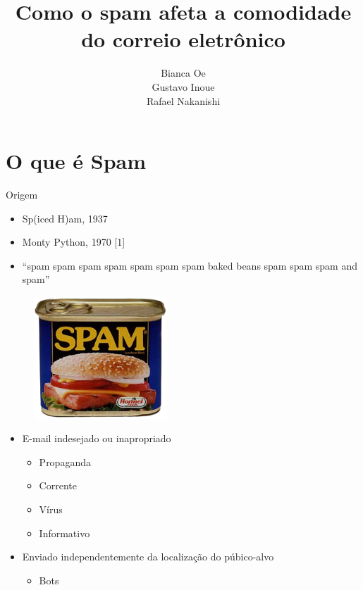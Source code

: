 \documentclass[dvipdfm]{beamer}
\title{Como o spam afeta a comodidade do correio eletrônico}
\author{Bianca Oe\\
		Gustavo Inoue\\
		Rafael Nakanishi}
\institute{Instituto de Ciências Matemáticas e Computação}
\begin{document}
\begin{frame}
	\titlepage
\end{frame}

\begin{frame}
\end{frame}

\section{O que é Spam}
\begin{frame}{Origem}
	\begin{itemize}
		\item Sp(iced H)am, 1937
		\item Monty Python, 1970 [1]
		\item “spam spam spam spam spam spam spam baked beans  spam spam spam and  spam”
	\end{itemize}

	\begin{figure}[h]
		\centering
		\includegraphics[width=5cm]{Imagens/spam/spam.png}
	\end{figure}
\end{frame}

\begin{frame}
	\begin{itemize}
		\item E-mail indesejado ou inapropriado
		\begin{itemize}
			\item Propaganda
			\item Corrente
			\item Vírus
			\item Informativo
		\end{itemize}	
		\item Enviado independentemente da localização do púbico-alvo
		\begin{itemize}
			\item Bots
		\end{itemize}
	\end{itemize}
\end{frame}
\end{document}
